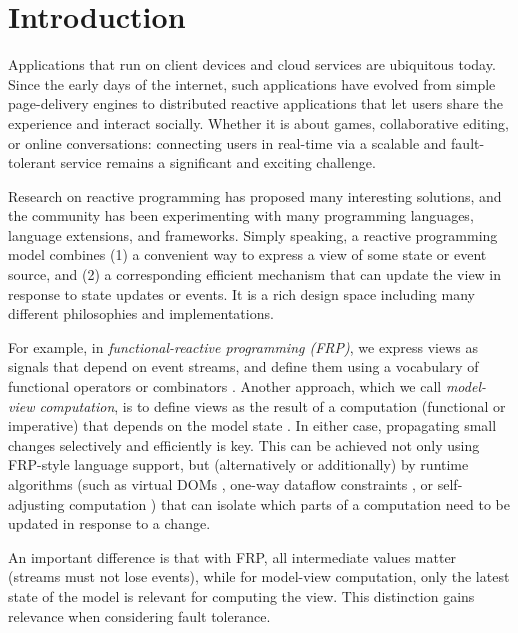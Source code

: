 \section{Introduction}

Applications that run on client devices and cloud services are ubiquitous today. Since the early days of the internet, such applications have evolved from simple page-delivery engines to distributed reactive applications that let users share the experience and interact socially. Whether it is about games, collaborative editing, or online conversations: connecting users in real-time via a scalable and fault-tolerant service remains a significant and exciting challenge.

 Research on reactive programming has proposed many interesting solutions, and the community has been experimenting with many programming languages, language extensions, and frameworks. Simply speaking, a reactive programming model combines (1) a convenient way to express a view of some state or event source, and (2) a corresponding efficient mechanism that can update the view in response to state updates or events. It is a rich design space including many different philosophies and implementations. 

For example, in \emph{functional-reactive programming (FRP)}, we express views as signals that depend on event streams, and define them using a vocabulary of functional operators or combinators \cite{frp-firstprinciples,frp-animation,frp-frtime,elm,afp}. Another approach, which we call \emph{model-view computation}, is to define views as the result of a computation (functional or imperative) that depends on the model state \cite{alive,react}. In either case, propagating small changes selectively and efficiently is key. This can be achieved not only using FRP-style language support, but (alternatively or additionally) by runtime algorithms (such as virtual DOMs \cite{react,alive}, one-way dataflow constraints \cite{camil}, or self-adjusting computation \cite{acar-ahmed-blume-POPL08}) that can isolate which parts of a computation need to be updated in response to a change.

An important difference is that with FRP, all intermediate values matter (streams must not lose events), while for model-view computation, only the latest state of the model is relevant for computing the view. This distinction gains relevance when considering fault tolerance.

